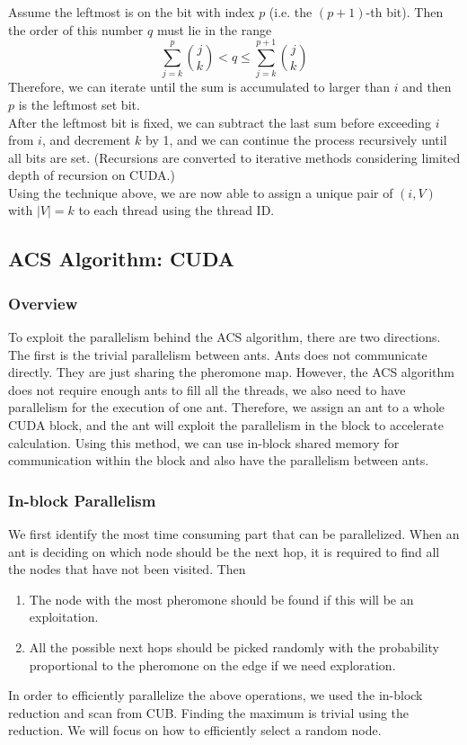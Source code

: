 \documentclass{article}
\begin{document}
    Assume the leftmost is on the bit with index $p$ (i.e. the $(p+1)$-th bit). Then the order of this number $q$ must lie in the range $$\sum_{j=k}^{p}{j\choose k} < q \leq \sum_{j=k}^{p+1}{j\choose k}$$Therefore, we can iterate until the sum is accumulated to larger than $i$ and then $p$ is the leftmost set bit. \\
    
    After the leftmost bit is fixed, we can subtract the last sum before exceeding $i$ from $i$, and decrement $k$ by 1, and we can continue the process recursively until all bits are set. (Recursions are converted to iterative methods considering limited depth of recursion on CUDA.)\\
    
    Using the technique above, we are now able to assign a unique pair of $(i, V)$ with $|V| = k$ to each thread using the thread ID.

\subsection{ACS Algorithm: CUDA}
\subsubsection{Overview}
    To exploit the parallelism behind the ACS algorithm, there are two directions. The first is the trivial parallelism between ants. Ants does not communicate directly. They are just sharing the pheromone map. However, the ACS algorithm does not require enough ants to fill all the threads, we also need to have parallelism for the execution of one ant. Therefore, we assign an ant to a whole CUDA block, and the ant will exploit the parallelism in the block to accelerate calculation. Using this method, we can use in-block shared memory for communication within the block and also have the parallelism between ants.
\subsubsection{In-block Parallelism}
    We first identify the most time consuming part that can be parallelized. When an ant is deciding on which node should be the next hop, it is required to find all the nodes that have not been visited. Then 
    \begin{enumerate}
        \item The node with the most pheromone should be found if this will be an exploitation.
        \item All the possible next hops should be picked randomly with the probability proportional to the pheromone on the edge if we need exploration.
    \end{enumerate}
    In order to efficiently parallelize the above operations, we used the in-block reduction and scan from CUB\cite{cub}. Finding the maximum is trivial using the reduction. We will focus on how to efficiently select a random node.
\end{document}
